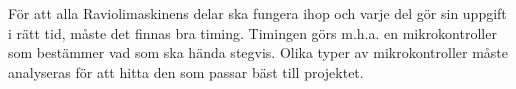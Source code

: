 För att alla Raviolimaskinens delar ska fungera ihop och varje del gör sin uppgift i rätt tid, måste det finnas bra timing. Timingen görs m.h.a. en mikrokontroller som bestämmer vad som ska hända stegvis. Olika typer av mikrokontroller måste analyseras för att hitta den som passar bäst till projektet.




